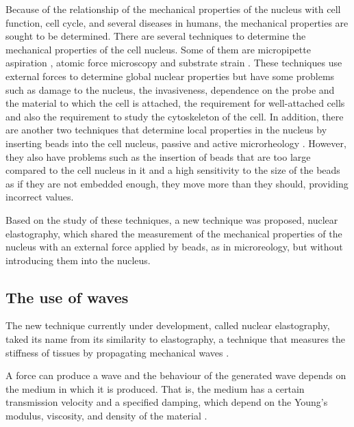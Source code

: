 \documentclass[12pt, a4paper]{article} %
\begin{document}
Because of the relationship of the mechanical properties of the nucleus with cell function, cell cycle, and several diseases in humans, the mechanical properties are sought to be determined. There are several techniques to determine the mechanical properties of the cell nucleus. Some of them are micropipette aspiration \cite{gonzalez2019advances}, atomic force microscopy \cite{janel2019stiffness} and substrate strain \cite{murphy2011automated}. These techniques use external forces to determine global nuclear properties but have some problems such as damage to the nucleus, the invasiveness, dependence on the probe and the material to which the cell is attached, the requirement for well-attached cells and also the requirement to study the cytoskeleton of the cell. In addition, there are another two techniques that determine local properties in the nucleus by inserting beads into the cell nucleus, passive and active microrheology \cite{lammerding2011mechanics, lammerding2007nuclear, de2007direct}. However, they also have problems such as the insertion of beads that are too large compared to the cell nucleus in it and a high sensitivity to the size of the beads as if they are not embedded enough, they move more than they should, providing incorrect values.

Based on the study of these techniques, a new technique was proposed, nuclear elastography, which shared the measurement of the mechanical properties of the nucleus with an external force applied by beads, as in microreology, but without introducing them into the nucleus. 
 
 \setlength{\parskip}{0mm}

\subsection{The use of waves}

The new technique currently under development, called nuclear elastography, taked its name from its similarity to elastography, a technique that measures the stiffness of tissues by propagating mechanical waves \cite{gennisson2013ultrasound}. 

\setlength{\parskip}{4mm}

A force can produce a wave and the behaviour of the generated wave depends on the medium in which it is produced. That is, the medium has a certain transmission velocity and a specified damping, which depend on the Young's modulus, viscosity, and density of the material \cite{achenbach2012wave}. 
\end{document}
